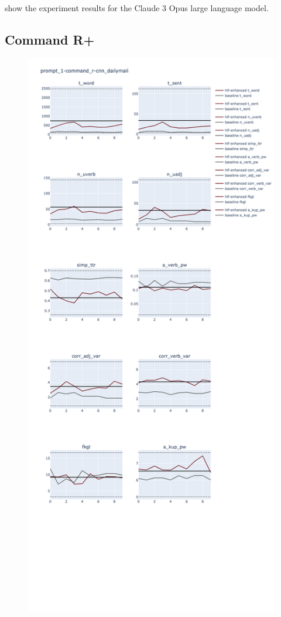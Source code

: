 \documentclass[a4paper,twoside]{article}
\begin{document}
show the experiment results for the Claude 3 Opus large language model.

\subsection{Command R+}

\begin{figure}[ht]
    \includegraphics[width=\textwidth,height=0.9\textheight,scale=1]{plots/prompt_1/prompt_1-command_r-cnn_dailymail/prompt_1-command_r-cnn_dailymail.png}

\end{figure}
\end{document}
